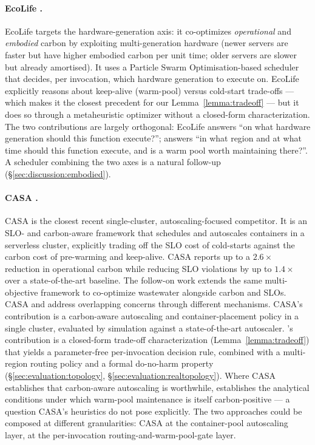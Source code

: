 \paragraph{EcoLife \citep{jiang2024ecolife}.} EcoLife targets the
hardware-generation axis: it co-optimizes \emph{operational} and
\emph{embodied} carbon by exploiting multi-generation hardware (newer
servers are faster but have higher embodied carbon per unit time;
older servers are slower but already amortised). It uses a Particle
Swarm Optimisation-based scheduler that decides, per invocation, which
hardware generation to execute on. EcoLife explicitly reasons about
keep-alive (warm-pool) versus cold-start trade-offs --- which makes
it the closest precedent for our Lemma~\ref{lemma:tradeoff} --- but
it does so through a metaheuristic optimizer without a closed-form
characterization. The two contributions are largely orthogonal:
EcoLife answers ``on what hardware generation should this function
execute?''; \GreenFaaS{} answers ``in what region and at what time
should this function execute, and is a warm pool worth maintaining
there?''. A scheduler combining the two axes is a natural follow-up
(\S\ref{sec:discussion:embodied}).

\paragraph{CASA \citep{qi2024casa}.} CASA is the closest recent
single-cluster, autoscaling-focused competitor. It is an SLO- and
carbon-aware framework that schedules and autoscales containers in a
serverless cluster, explicitly trading off the SLO cost of cold-starts
against the carbon cost of pre-warming and keep-alive. CASA reports up
to a $2.6\times$ reduction in operational carbon while reducing SLO
violations by up to $1.4\times$ over a state-of-the-art baseline. The
follow-on work \citep{qi2024wastewater} extends the same multi-objective
framework to co-optimize wastewater alongside carbon and SLOs. CASA
and \GreenFaaS{} address overlapping concerns through different
mechanisms. CASA's contribution is a carbon-aware autoscaling and
container-placement policy in a single cluster, evaluated by simulation
against a state-of-the-art autoscaler. \GreenFaaS's contribution is a
closed-form trade-off characterization
(Lemma~\ref{lemma:tradeoff}) that yields a parameter-free per-invocation
decision rule, combined with a multi-region routing policy and a
formal do-no-harm property
(\S\ref{sec:evaluation:topology},
\S\ref{sec:evaluation:realtopology}). Where CASA establishes that
carbon-aware autoscaling is worthwhile, \GreenFaaS{} establishes the
analytical conditions under which warm-pool maintenance is itself
carbon-positive --- a question CASA's heuristics do not pose
explicitly. The two approaches could be composed at different
granularities: CASA at the container-pool autoscaling layer, \GreenFaaS{}
at the per-invocation routing-and-warm-pool-gate layer.

